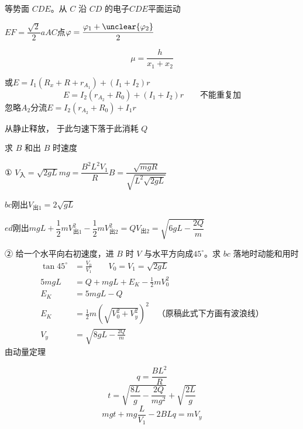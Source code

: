 \begin{problem}
等势面 $CDE$。从 $C$ 沿 $CD$ 的电子$CDE$平面运动 %

$EF=\dfrac{\sqrt2}{2}a$\qquad $AC$点\quad $\varphi=\dfrac{\varphi_1+\unclear{\varphi_2}}{2}$ %
\end{problem}
\[ \mu=\frac{h}{x_1+x_2} \]
\begin{problem}
\begin{solution}
或\quad $E=I_1(R_x+R+r_{A_1})+(I_1+I_2)r$
\[ E=I_2(r_{A_2}+R_0)+(I_1+I_2)r\qquad\text{不能重复加} \]
忽略$A_2$分流\quad $E=I_2(r_{A_2}+R_0)+I_1r$
\end{solution}
\end{problem}
\begin{problem}
从静止释放，
于此匀速下落\quad 于此消耗 $Q$

求 $B$ 和出 $B$ 时速度
\begin{solution}
① \quad $V_{\text{入}}=\sqrt{2gL}$\qquad $mg=\dfrac{B^2L^2V_1}{R}$\qquad $B=\dfrac{\sqrt{mgR}}{\sqrt{L^2\sqrt{2gL}}}$

$bc$刚出\quad $V_{\text{出}1}=2\sqrt{gL}$

$ed$刚出\quad $mgL+\dfrac12mV_{\text{出}1}^2-\dfrac12mV_{\text{出}2}^2=Q$\qquad $V_{\text{出}2}=\sqrt{6gL-\dfrac{2Q}{m}}$

② \quad 给一个水平向右初速度，进 $B$ 时 $V$ 与水平方向成$45^\circ$。求 $bc$ 落地时动能和用时
\begin{align*}
\tan45^\circ&=\frac{V_0}{V_1}\qquad V_0=V_1=\sqrt{2gL}\\
5mgL&=Q+mgL+E_K-\frac12mV_0^2\\
E_K&=5mgL-Q\\
E_K&=\frac12m\left(\sqrt{V_0^2+V_y^2}\right)^2 \quad\text{（原稿此式下方画有波浪线）}\\
V_y&=\sqrt{8gL-\frac{2Q}{m}}
\end{align*}
由动量定理

\[ q=\frac{BL^2}{R} \]
\[ t=\sqrt{\frac{8L}{g}-\frac{2Q}{mg^2}}+\sqrt{\frac{2L}{g}} \]
\[ mgt+mg\frac{L}{V_1}-2BLq=mV_y \] %
\end{solution}
\end{problem}
